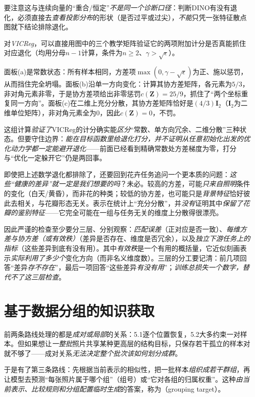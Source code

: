 要注意这与连续向量的“重合/恒定”\emph{不是同一个诊断口径}：判断DINO有没有退化，必须直接去\emph{查看投影分布}的形状（是否过平或过尖），\emph{不能}只凭一张特征散点图就下结论排除退化。

对\emph{VICReg}，可以直接用图中的三个教学矩阵验证它的两项附加计分是否真能抓住对应退化（均用分母$n-1$计算，条件为$n\geq2$、$\gamma>\sqrt{\epsilon}$）。

面板(a)是常数状态：所有样本相同，方差项$\max(0,\gamma-\sqrt{\epsilon})$为正、施以惩罚，从而挡住完全坍塌。面板(b)沿单一方向变化：计算其协方差矩阵，各元素为$5/3$，非对角元素非零，于是协方差项给出非零惩罚$c(\bm{Z})=25/9$，抓住了“两个坐标重复同一方向”。面板(c)在二维上充分分散，其协方差矩阵恰好是$(4/3)\bm{I}_2$（$\bm{I}_2$为二维单位矩阵），非对角元素全为0，因此$c(\bm{Z})=0$，不罚。

这组计算\emph{验证了}VICReg的计分确实能\emph{区分}“常数、单方向冗余、二维分散”三种状态。但要守住边界：\emph{能在目标函数里给退化打分，并不证明从任意初始化出发的优化动力学都一定能避开退化}——前面已经看到精确常数处方差梯度为零，打分与“优化一定躲开它”仍是两回事。

即使把上述数学退化都排除了，还要回到花卉任务追问一个更本质的问题：\emph{这些“健康的差异”就一定是我们想要的吗}？未必。较高的方差，可能\emph{只来自照明}条件的变化（白天/黄昏），而非花的种类；较低的协方差，也可能只是\emph{背景特征}恰好彼此去相关，与花瓣形态无关。表示在统计上“充分分散”，并\emph{没有}证明其中\emph{保留了花瓣的鉴别特征}——它完全可能在一组与任务无关的维度上分散得很漂亮。

因此严谨的检查至少要分三层、分别观察：\emph{匹配误差}（正对应是否一致）、\emph{每维方差与协方差（或有效秩）}（差异是否存在、维度是否冗余），以及\emph{独立下游任务上的指标}（这些差异到底有没有用）。其中\emph{有效秩}是一个有用的概括量，它近似刻画表示\emph{实际利用了多少个}变化方向（而非名义维度数）。三层的分工要记清：前几项回答“差异\emph{存不存在}”，最后一项回答“这些差异\emph{有没有用}”；\emph{训练总损失一个数字，替代不了这三层检查}。

\section{基于数据分组的知识获取}
\label{sec:data-derived-knowledge-grouping}

前两条路线处理的都是\emph{成对或局部}的关系：5.1逐个位置恢复，5.2大多约束一对样本。但如果想让\emph{一整批}照片共享某种更高层的结构目标，只保存若干孤立的样本对就不够了——成对关系\emph{无法决定整个批次该如何划分成群}。

于是有了第三条路线：先根据当前表示的相似性，把一批样本\emph{组织成若干群组}，再让模型去预测“每张照片属于哪个组”（组号）或“它对各组的归属权重”。这种\emph{由当前表示、比较规则和分组配置临时生成}的答案，称为（grouping target）。


